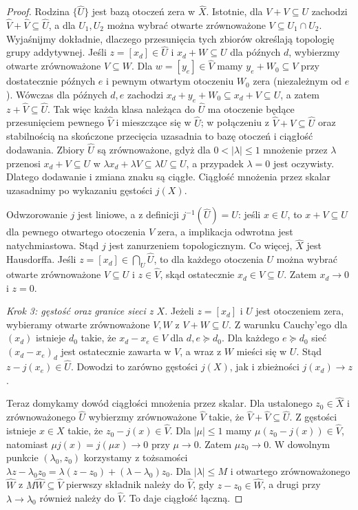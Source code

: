 \begin{proof}
Rodzina $\{\widehat U\}$ jest bazą otoczeń zera w
$\widehat X$. Istotnie, dla $V+V\subseteq U$ zachodzi
$\widehat V+\widehat V\subseteq\widehat U$,
a dla $U_1,U_2$ można wybrać otwarte zrównoważone
$V\subseteq U_1\cap U_2$. Wyjaśnijmy dokładnie, dlaczego przesunięcia tych zbiorów
określają topologię grupy addytywnej. Jeśli
$z=[x_d]\in\widehat U$ i $x_d+W\subseteq U$ dla późnych $d$,
wybierzmy otwarte zrównoważone $V\subseteq W$.
Dla $w=[y_e]\in\widehat V$ mamy
$y_e+W_0\subseteq V$ przy dostatecznie późnych $e$
i pewnym otwartym otoczeniu $W_0$ zera (niezależnym od $e$).
Wówczas dla późnych $d,e$ zachodzi
$x_d+y_e+W_0\subseteq x_d+V\subseteq U$,
a zatem $z+\widehat V\subseteq\widehat U$.
Tak więc każda klasa należąca do $\widehat U$ ma
otoczenie będące przesunięciem pewnego $\widehat V$
i mieszczące się w $\widehat U$; w połączeniu z
$\widehat V+\widehat V\subseteq\widehat U$ oraz
stabilnością na skończone przecięcia uzasadnia to
bazę otoczeń i ciągłość dodawania.
Zbiory $\widehat U$ są zrównoważone, gdyż dla
$0<|\lambda|\leq1$ mnożenie przez $\lambda$
przenosi $x_d+V\subseteq U$ w
$\lambda x_d+\lambda V\subseteq\lambda U\subseteq U$,
a przypadek $\lambda=0$ jest oczywisty.
Dlatego dodawanie i zmiana znaku są ciągłe. Ciągłość
mnożenia przez skalar uzasadnimy po wykazaniu gęstości $j(X)$.

Odwzorowanie $j$ jest liniowe, a z definicji
$j^{-1}(\widehat U)=U$: jeśli $x\in U$, to
$x+V\subseteq U$ dla pewnego otwartego otoczenia $V$ zera,
a implikacja odwrotna jest natychmiastowa.
Stąd $j$ jest zanurzeniem topologicznym. Co więcej,
$\widehat X$ jest Hausdorffa. Jeśli
$z=[x_d]\in\bigcap_U\widehat U$, to dla każdego otoczenia
$U$ można wybrać otwarte zrównoważone $V\subseteq U$
i $z\in\widehat V$, skąd ostatecznie $x_d\in V\subseteq U$.
Zatem $x_d\to0$ i $z=0$.

\emph{Krok 3: gęstość oraz granice sieci z $X$.}
Jeżeli $z=[x_d]$ i $U$ jest otoczeniem zera, wybieramy
otwarte zrównoważone $V,W$ z $V+W\subseteq U$.
Z warunku Cauchy'ego dla $(x_d)$ istnieje $d_0$ takie, że
$x_d-x_e\in V$ dla $d,e\succeq d_0$.
Dla każdego $e\succeq d_0$ sieć $(x_d-x_e)_d$ jest
ostatecznie zawarta w $V$, a wraz z $W$ mieści się w $U$.
Stąd $z-j(x_e)\in\widehat U$. Dowodzi to zarówno
gęstości $j(X)$, jak i zbieżności $j(x_d)\to z$.

Teraz domykamy dowód ciągłości mnożenia przez skalar.
Dla ustalonego $z_0\in\widehat X$ i zrównoważonego
$\widehat U$ wybierzmy zrównoważone $\widehat V$
takie, że $\widehat V+\widehat V\subseteq\widehat U$.
Z gęstości istnieje $x\in X$ takie, że
$z_0-j(x)\in\widehat V$. Dla $|\mu|\leq1$ mamy
$\mu(z_0-j(x))\in\widehat V$, natomiast
$\mu j(x)=j(\mu x)\to0$ przy $\mu\to0$.
Zatem $\mu z_0\to0$. W dowolnym punkcie
$(\lambda_0,z_0)$ korzystamy z tożsamości
$\lambda z-\lambda_0z_0=\lambda(z-z_0)+
(\lambda-\lambda_0)z_0$. Dla $|\lambda|\leq M$
i otwartego zrównoważonego $\widehat W$ z
$M\widehat W\subseteq\widehat V$ pierwszy składnik
należy do $\widehat V$, gdy $z-z_0\in\widehat W$,
a drugi przy $\lambda\to\lambda_0$ również należy
do $\widehat V$. To daje ciągłość łączną.


\end{proof}
